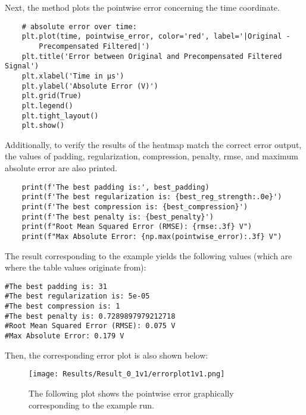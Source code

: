 \documentclass[11pt, a4paper]{article}
\theoremstyle{definition}
\numberwithin{equation}{section}
\begin{document}
Next, the method plots the pointwise error concerning the time coordinate.

\begin{verbatim}
    # absolute error over time:
    plt.plot(time, pointwise_error, color='red', label='|Original - 
        Precompensated Filtered|')
    plt.title('Error between Original and Precompensated Filtered Signal')
    plt.xlabel('Time in µs')
    plt.ylabel('Absolute Error (V)')
    plt.grid(True)
    plt.legend()
    plt.tight_layout()
    plt.show()
\end{verbatim}

Additionally, to verify the results of the heatmap match the correct error output, the values of padding, regularization, compression, penalty, rmse, and maximum absolute error are also printed.

\begin{verbatim}
    print(f'The best padding is:', best_padding)
    print(f'The best regularization is: {best_reg_strength:.0e}')
    print(f'The best compression is: {best_compression}')
    print(f'The best penalty is: {best_penalty}')
    print(f"Root Mean Squared Error (RMSE): {rmse:.3f} V")
    print(f"Max Absolute Error: {np.max(pointwise_error):.3f} V")
\end{verbatim}

The result corresponding to the example yields the following values (which are where the table values originate from):

\begin{verbatim}
#The best padding is: 31
#The best regularization is: 5e-05
#The best compression is: 1
#The best penalty is: 0.7289897979212718
#Root Mean Squared Error (RMSE): 0.075 V
#Max Absolute Error: 0.179 V
\end{verbatim}

Then, the corresponding error plot is also shown below:

\begin{figure}[h!]
    \centering
\texttt{[image: Results/Result\_0\_1v1/errorplot1v1.png]}
    \caption{The following plot shows the pointwise error graphically corresponding to the example run.}
\end{figure} \label{errorplot1v1}
\end{document}

